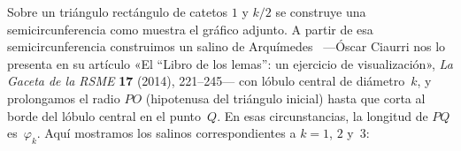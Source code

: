 \documentclass[autocontact]{gaceta}
\begin{document}
\begin{figure}%
\vspace*{-1mm}%
\hspace*{-2mm}%
\newcommand{\kmedios}{1.5}%
\newcommand{\mediaMetalica}{3.3027756}%
\newcommand{\diametroEntrante}{0.3027756}%
\newcommand{\radio}{1.80278}%
\end{figure}
Sobre un triángulo rectángulo de catetos $1$ y $k/2$ se construye una semicircunferencia como muestra el gráfico adjunto.
%
%
A partir de esa semicircunferencia construimos un salino de Arquímedes 
~---\'Oscar Ciaurri nos lo presenta en su artículo «El ``Libro de los lemas'': un ejercicio de visualización»,
\textit{La Gaceta de la RSME} \textbf{17} (2014), 221--245---
con lóbulo central de diámetro~$k$,
y prolongamos el radio $PO$ (hipotenusa del triángulo inicial) hasta que corta al borde del lóbulo central en el punto~$Q$. 
En esas circunstancias, la longitud de $PQ$ es~$\varphi_k$.
Aquí mostramos los salinos correspondientes a $k=1$, $2$ y~$3$:
\end{document}
